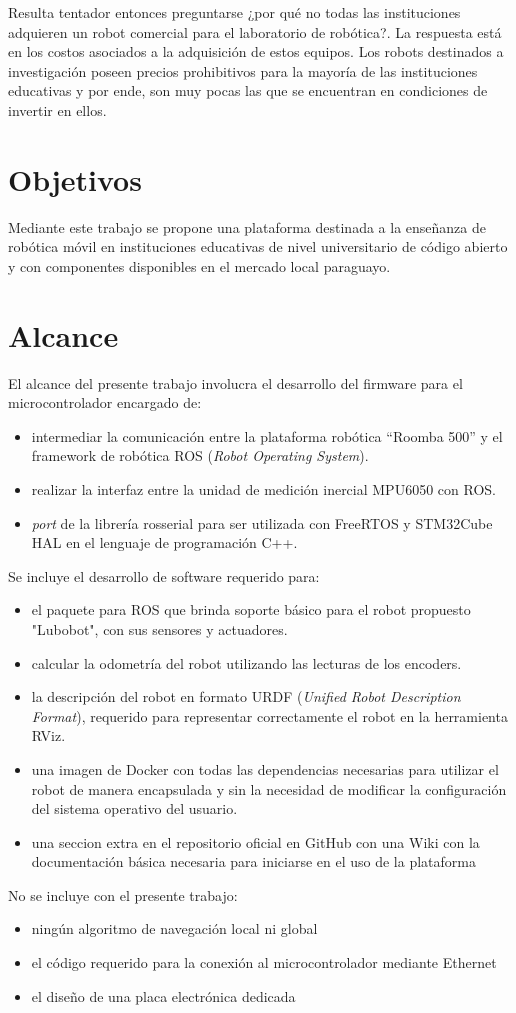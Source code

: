 Resulta tentador entonces preguntarse ¿por qué no todas las instituciones adquieren un robot comercial para el laboratorio de robótica?. La respuesta está en los costos asociados a la adquisición de estos equipos. Los robots destinados a investigación poseen precios prohibitivos para la mayoría de las instituciones educativas y por ende, son muy pocas las que se encuentran en condiciones de invertir en ellos.


\section{Objetivos}

Mediante este trabajo se propone una plataforma destinada a la enseñanza de robótica móvil en instituciones educativas de nivel universitario de código abierto y con componentes disponibles en el mercado local paraguayo.

\section{Alcance}

El alcance del presente trabajo involucra el desarrollo del firmware para el microcontrolador encargado de:
\begin{itemize}
	\item intermediar la comunicación entre la plataforma robótica ``Roomba 500'' y el framework de robótica ROS (\textit{Robot Operating System}).
	\item realizar la interfaz entre la unidad de medición inercial MPU6050 con ROS.
	\item \textit{port} de la librería rosserial para ser utilizada con FreeRTOS y STM32Cube HAL en el lenguaje de programación C++.
\end{itemize}

Se incluye el desarrollo de software requerido para:
\begin{itemize}
	\item el paquete para ROS que brinda soporte básico para el robot propuesto "Lubobot", con sus sensores y actuadores.
	\item calcular la odometría del robot utilizando las lecturas de los encoders.
	\item la descripción del robot en formato URDF (\textit{Unified Robot Description Format}), requerido para representar correctamente el robot en la herramienta RViz.
	\item una imagen de Docker con todas las dependencias necesarias para utilizar el robot de manera encapsulada y sin la necesidad de modificar la configuración del sistema operativo del usuario.
	\item una seccion extra en el repositorio oficial en GitHub con una Wiki con la documentación básica necesaria para iniciarse en el uso de la plataforma
\end{itemize}

No se incluye con el presente trabajo:
\begin{itemize}
	\item ningún algoritmo de navegación local ni global
	\item el código requerido para la conexión al microcontrolador mediante Ethernet
	\item el diseño de una placa electrónica dedicada
\end{itemize}